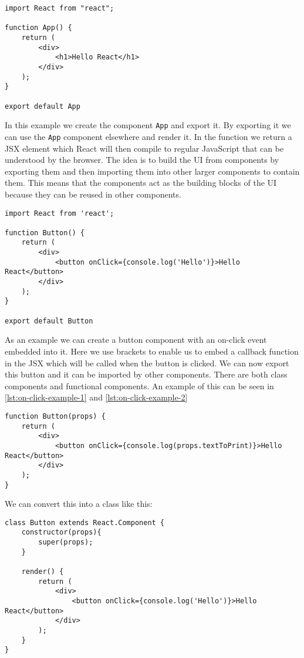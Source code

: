\begin{lstlisting}
import React from "react";

function App() {
    return (
        <div>
            <h1>Hello React</h1>
        </div>
    );
}

export default App
\end{lstlisting}
In this example we create the component \texttt{App} and export it.
By exporting it we can use the \texttt{App} component elsewhere and render it.
In the function we return a JSX element which React will then compile to regular JavaScript that can be understood by the browser.
The idea is to build the UI from components by exporting them and then importing them into other larger components to contain them.
This means that the components act as the building blocks of the UI because they can be reused in other components.
\begin{lstlisting}
import React from 'react';

function Button() {
    return (
        <div>
            <button onClick={console.log('Hello')}>Hello React</button>
        </div>
    );
}

export default Button
\end{lstlisting}
As an example we can create a button component with an on-click event embedded into it.
Here we use brackets to enable us to embed a callback function in the JSX which will be called when the button is clicked.
We can now export this button and it can be imported by other components.
There are both class components and functional components.
An example of this can be seen in \autoref{lst:on-click-example-1} and \autoref{lst:on-click-example-2}

\begin{lstlisting}[caption={Example of a button with a onClick event in a functional component},label={lst:on-click-example-1}]
function Button(props) {
	return (
		<div>
			<button onClick={console.log(props.textToPrint)}>Hello React</button>
		</div>
	);
}
\end{lstlisting}

We can convert this into a class like this:

\begin{lstlisting}[caption={Example of a button with a onClick event in a class component},label={lst:on-click-example-2}]
class Button extends React.Component {
	constructor(props){
		super(props);
	}

	render() {
		return (
			<div>
				<button onClick={console.log('Hello')}>Hello React</button>
			</div>
		);
	}
}
\end{lstlisting}


